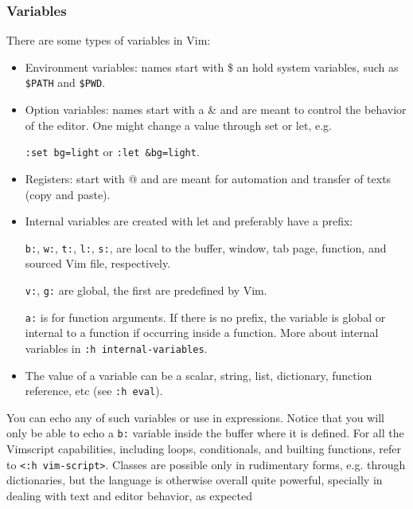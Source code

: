 \documentclass{article}
\newcommand{\ttt}[1] {
	\texttt{<#1>}}
\newcommand{\tttt}[1] {
	\texttt{#1}}
\begin{document}
\subsubsection{Variables}
There are some types of variables in Vim:
\begin{itemize}
	\item Environment variables: names start with \$ an hold system
		variables, such as \tttt{\$PATH} and \tttt{\$PWD}.
	\item Option variables: names start with a \& and are meant to control the behavior of the editor.
		One might change a value through set or let, e.g.
		\tttt{:set bg=light} or \tttt{:let \&bg=light}.
	\item Registers: start with @ and are meant for automation and transfer of texts (copy and paste).
	\item Internal variables are created with let and preferably have a prefix:
	\tttt{b:}, \tttt{w:}, \tttt{t:}, \tttt{l:}, \tttt{s:},
		are local to the buffer, window, tab page, function, and
		sourced Vim file, respectively.
 \tttt{v:}, \tttt{g:} are global, the first are predefined by Vim.
		\tttt{a:} is for function arguments.
		If there is no prefix, the variable is global or internal to a function if occurring inside a function.
		More about internal variables in \tttt{:h internal-variables}.
	\item The value of a variable can be a scalar, string, list, dictionary, function reference, etc (see \tttt{:h eval}).
\end{itemize}
You can echo any of such variables or use in expressions.
Notice that you will only be able to echo a \tttt{b:} variable inside
the buffer where it is defined.
For all the Vimscript capabilities, including loops, conditionals,
and builting functions, refer to \ttt{:h vim-script}.
Classes are possible only in rudimentary forms, e.g. through dictionaries,
but the language is otherwise overall quite powerful,
specially in dealing with text and editor behavior, as expected
\end{document}
